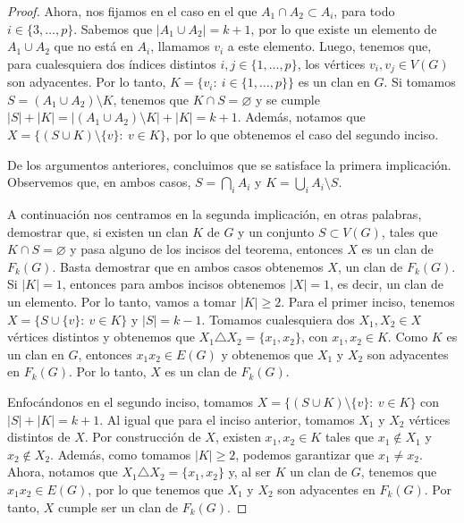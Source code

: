 \begin{proof}
    Ahora, nos fijamos en el caso en el que $A_1 \cap A_2 \subset A_i$, para
    todo $i\in \{3, \dots, p\}$. Sabemos que $|A_1 \cup A_2| = k+1$, por lo que
    existe un elemento de $A_1 \cup A_2$ que no est\'a en $A_i$, llamamos $v_i$
    a este elemento. Luego, tenemos que, para cualesquiera dos \'indices
    distintos $i, j \in \{1, \dots, p\}$, los v\'ertices $v_i, v_j \in V(G)$ son
    adyacentes. Por lo tanto, $K= \{v_i\colon\ i \in \{1, \dots, p\}\}$ es un
    clan en $G$. Si tomamos $S= (A_1 \cup A_2)\setminus K$, tenemos que $K \cap
    S = \varnothing$ y se cumple $|S| + |K|= |(A_1 \cup A_2)\setminus K| + |K| =
    k+1$. Adem\'as, notamos que $X = \{(S \cup K)\setminus \{v\}\colon\ v\in
    K\}$, por lo que obtenemos el caso del segundo inciso.

    De los argumentos anteriores, concluimos que se satisface la primera
    implicaci\'on. Observemos que, en ambos casos, $S = \bigcap\limits_{i} A_i$
    y $K = \bigcup\limits_{i} A_i \setminus S$.
        
    A continuaci\'on nos centramos en la segunda implicaci\'on, en otras
    palabras, demostrar que, si existen un clan $K$ de $G$ y un conjunto $S
    \subset V(G)$, tales que $K \cap S = \varnothing$ y pasa alguno de los
    incisos del teorema, entonces $X$ es un clan de $F_k(G)$. Basta demostrar
    que en ambos casos obtenemos $X$, un clan de $F_k(G)$. Si $|K| =1$, entonces
    para ambos incisos obtenemos $|X| =1$, es decir, un clan de un elemento. Por
    lo tanto, vamos a tomar $|K| \geq 2$. Para el primer inciso, tenemos $X =
    \{S \cup \{v\}\colon\ v \in K\}$ y $|S| = k-1$. Tomamos cualesquiera dos
    $X_1, X_2 \in X$ v\'ertices distintos y obtenemos que $X_1 \triangle X_2
    =\{x_1, x_2\}$, con $x_1, x_2 \in K$. Como $K$ es un clan en $G$, entonces
    $x_1x_2 \in E(G)$ y obtenemos que $X_1$ y $X_2$ son adyacentes en $F_k(G)$.
    Por lo tanto, $X$ es un clan de $F_k(G)$.

    Enfoc\'andonos en el segundo inciso, tomamos $X = \{(S\cup K) \setminus
    \{v\}\colon\ v \in K \}$ con $|S| + |K| = k+1$. Al igual que para el inciso
    anterior, tomamos $X_1$ y $X_2$ v\'ertices distintos de $X$. Por
    construcci\'on de $X$, existen $x_1, x_2 \in K$ tales que $x_1 \notin X_1$ y
    $x_2 \notin X_2$. Adem\'as, como tomamos $|K| \geq 2$, podemos garantizar
    que $x_1 \neq x_2$. Ahora, notamos que $X_1 \triangle X_2 = \{x_1, x_2\}$ y,
    al ser $K$ un clan de $G$, tenemos que $x_1x_2 \in E(G)$, por lo que tenemos
    que $X_1$ y $X_2$ son adyacentes en $F_k(G)$. Por tanto, $X$ cumple ser un
    clan de $F_k(G)$.
\end{proof}
    
